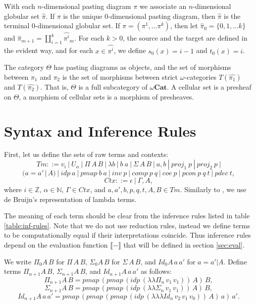 \documentclass{amsart}
\theoremstyle{definition}
\theoremstyle{remark}
\newcommand{\cat}[1]{\mathbf{#1}}
\newcommand{\nats}{\mathbb{N}}
\newcommand{\Z}{\mathbb{Z}}
\newcommand{\ocat}{\omega \cat{Cat}}
\numberwithin{table}{section}
\begin{document}
With each $n$-dimensional pasting diagram $\pi$ we associate an $n$-dimensional globular set $\widehat{\pi}$.
If $\pi$ is the unique $0$-dimensional pasting diagram, then $\widehat{\pi}$ is the terminal $0$-dimensional globular set.
If $\pi = (\pi^1, \ldots \pi^k)$, then let $\widehat{\pi}_0 = \{0, 1, \ldots k\}$
and $\widehat{\pi}_{m+1} = \coprod \limits_{i = 1}^k \widehat{\pi^i}_m$.
For each $k > 0$, the source and the target are defined in the evident way,
and for each $x \in \widehat{\pi^i}$, we define $s_0(x) = i - 1$ and $t_0(x) = i$.

\begin{defn}
The category $\Theta$ has pasting diagrams as objects, and the set of morphisms between $\pi_1$ and $\pi_2$
is the set of morphisms between strict $\omega$-categories $T(\widehat{\pi_1})$ and $T(\widehat{\pi_2})$.
That is, $\Theta$ is a full subcategory of $\ocat$.
A cellular set is a presheaf on $\Theta$, a morphism of cellular sets is a morphism of presheaves.
\end{defn}

\section{Syntax and Inference Rules}

First, let us define the sets of raw terms and contexts:
\[ Tm ::= v_i\ |\ U_\alpha\ |\ \Pi\,A\,B\ |\ \lambda b\ |\ b\ a\ |\ \Sigma\,A\,B\ |\ a , b\ |\ proj_1\ p\ |\ proj_2\ p\ | \]
\[ (a = a'\,|\,A)\ |\ idp\ a\ |\ pmap\ b\ a\ |\ inv\ p\ |\ comp\ p\ q\ |\ coe\ p\ |\ pcon\ p\ q\ t\ |\ pdec\ t, \]
\[ Ctx ::= \epsilon\ |\ \Gamma, A, \]
where $i \in \Z$, $\alpha \in \nats$, $\Gamma \in Ctx$, and $a, a', b, p, q, t, A, B \in Tm$.
Similarly to \cite{norm}, we use de Bruijn's representation of lambda terms.

The meaning of each term should be clear from the inference rules listed in table \ref{table:inf-rules}.
Note that we do not use reduction rules, instead we define terms to be computationally equal if their interpretations coincide.
Thus inference rules depend on the evaluation function $\llbracket - \rrbracket$ that will be defined in section \ref{sec:eval}.

We write $\Pi_0 A\,B$ for $\Pi\,A\,B$, $\Sigma_0 A\,B$ for $\Sigma\,A\,B$, and $Id_0 A\,a\,a'$ for $a = a' | A$.
Define terms $\Pi_{n+1} A\,B$, $\Sigma_{n+1} A\,B$, and $Id_{n+1} A\,a\,a'$ as follows:
\[ \Pi_{n+1} A\,B = pmap\,(pmap\,(idp\ (\lambda \lambda \Pi_n\,v_1\,v_1))\,A)\,B, \]
\[ \Sigma_{n+1} A\,B = pmap\,(pmap\,(idp\ (\lambda \lambda \Sigma_n\,v_1\,v_1))\,A)\,B, \]
\[ Id_{n+1} A\,a\,a' = pmap\,(pmap\,(pmap\,(idp\ (\lambda \lambda \lambda Id_n\,v_2\,v_1\,v_0))\,A)\,a)\,a'. \]
\end{document}
